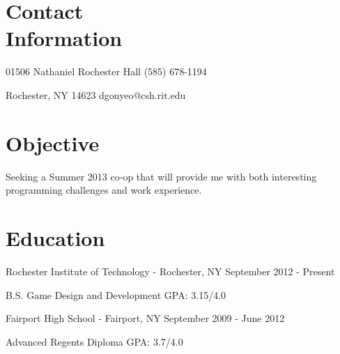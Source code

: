 \documentclass[letterpaper,margin,line,11pt]{resume}
\newcommand{\rdate}[1]{\hfill {\small #1}}
\begin{document}
\begin{resume}
\section{\mysidestyle Contact \\ Information} 
	\begin{asparablank}
		\item 01506 Nathaniel Rochester Hall \hfill (585) 678-1194
		\item Rochester, NY 14623 \hfill dgonyeo@csh.rit.edu
	\end{asparablank}

\section{\mysidestyle Objective}
	Seeking a Summer 2013 co-op that will provide me with both interesting programming challenges and work experience.

\section{\mysidestyle Education}
	\begin{compactdesc}
		\item[Rochester Institute of Technology] - Rochester, NY \rdate{September 2012 - Present}
		\begin{compactitem} { \small
			\item B.S. Game Design and Development \hfill GPA: 3.15/4.0 \\
		} \end{compactitem}
                \item[Fairport High School] - Fairport, NY \rdate{September 2009 - June 2012}
                \begin{compactitem} {\small
                        \item Advanced Regents Diploma \hfill GPA: 3.7/4.0
                } \end{compactitem}
	\end{compactdesc}


\end{resume}
\end{document}
